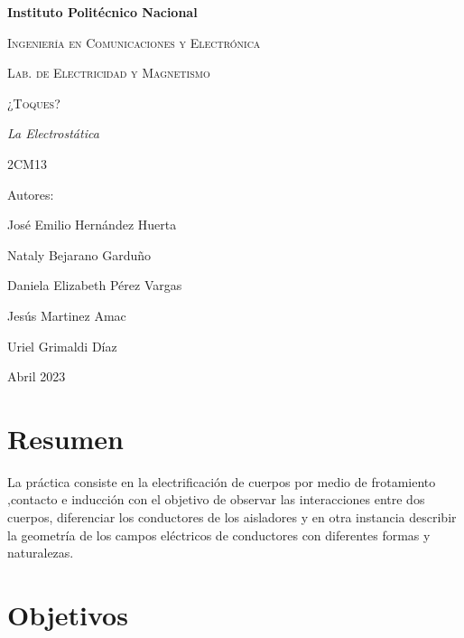 \documentclass[14pt]{article}
\begin{document}
	\lhead{}
	\begin{titlepage}
		\begin{figure}[t]
			\hspace{0.6\textwidth}
		\end{figure}
		\centering
		{\bfseries\Huge Instituto Politécnico Nacional \par}
		\vspace{1cm}
		{\scshape\Large Ingeniería en Comunicaciones y Electrónica \par}
		\vspace{0.3cm}
		{\scshape\Large Lab. de Electricidad y Magnetismo  \par}
		\vspace{1cm}
		{\scshape\Huge ¿Toques? \par}
		\vspace{1cm}
		{\itshape\Large La Electrostática\par}
		{\Large 2CM13\par}
		\vfill
		{\Large Autores: \par}
		{\Large José Emilio Hernández Huerta \par}
		{\Large Nataly Bejarano Garduño \par}
		{\Large Daniela Elizabeth Pérez Vargas \par}
		{\Large Jesús Martinez Amac\par}
		{\Large Uriel Grimaldi Díaz  \par}
		\vfill
		{\Large Abril 2023 \par}
	\end{titlepage}
	 \tableofcontents
	 
	\newpage
	\section{Resumen}
	La práctica consiste en la electrificación de cuerpos por medio de frotamiento ,contacto e inducción con el objetivo de observar las interacciones entre dos cuerpos, diferenciar los conductores de los aisladores y en otra instancia describir la geometría de los campos eléctricos de conductores con diferentes formas y naturalezas.
	\section{Objetivos} 
\end{document}
